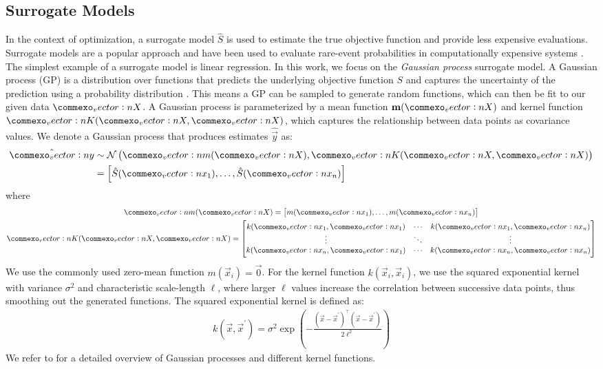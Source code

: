 \subsection{Surrogate Models}
In the context of optimization, a surrogate model $\hat{S}$ is used to estimate the true objective function and provide less expensive evaluations.
Surrogate models are a popular approach and have been used to evaluate rare-event probabilities in computationally expensive systems \cite{li2010evaluation,li2011efficient}.
The simplest example of a surrogate model is linear regression.
In this work, we focus on the \textit{Gaussian process} surrogate model.
A Gaussian process (GP) is a distribution over functions that predicts the underlying objective function $S$ and captures the uncertainty of the prediction using a probability distribution \cite{Kochenderfer2019}.
This means a GP can be sampled to generate random functions, which can then be fit to our given data $\mat{X}$.
A Gaussian process is parameterized by a mean function $\m(\mat{X})$ and kernel function $\mat{K}(\mat{X},\mat{X})$, which captures the relationship between data points as covariance values.
We denote a Gaussian process that produces estimates $\hat{\vec{y}}$ as:
\begin{align*}
\hat{\vec{y}} &\sim\mathcal{N}\left(\vec{m}(\mat{X}),\vec{K}(\mat{X},\mat{X})\right)\\
        &= \begin{bmatrix} %
            \hat{S}(\vec{x}_1), \ldots, \hat{S}(\vec{x}_n)
        \end{bmatrix}
\end{align*}
where
\begin{gather*}
\vec{m}(\mat{X}) = \begin{bmatrix} m(\vec{x}_1), \ldots, m(\vec{x}_n) \end{bmatrix}\\
\vec{K}(\mat{X}, \mat{X}) = \begin{bmatrix}
         k(\vec{x}_1, \vec{x}_1) & \cdots & k(\vec{x}_1, \vec{x}_n)\\
         \vdots & \ddots & \vdots\\
         k(\vec{x}_n, \vec{x}_1) & \cdots & k(\vec{x}_n, \vec{x}_n)
     \end{bmatrix}
\end{gather*}
We use the commonly used zero-mean function $m(\vec{x}_i) = \vec{0}$.
For the kernel function $k(\vec{x}_i, \vec{x}_i)$, we use the squared exponential kernel with variance $\sigma^2$ and characteristic scale-length $\ell$, where larger $\ell$ values increase the correlation between successive data points, thus smoothing out the generated functions. The squared exponential kernel is defined as:
\begin{align*}
k(\vec{x},\vec{x}^\prime) = \sigma^2\exp\left(- \frac{(\vec{x} - \vec{x}^\prime)^\top(\vec{x} - \vec{x}^\prime)}{2\ell^2}\right)
\end{align*}
We refer to \cite{Kochenderfer2019} for a detailed overview of Gaussian processes and different kernel functions.



